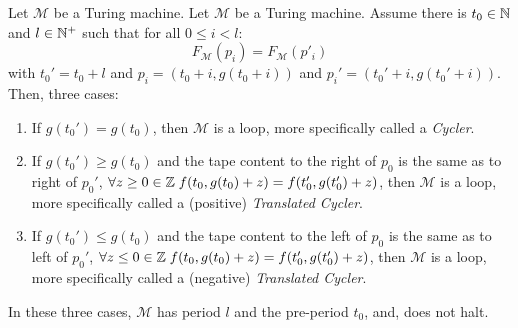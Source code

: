 \begin{theorem}[Loops] Let $\mathcal{M}$ be a Turing machine.
    Let $\mathcal{M}$ be a Turing machine.
    Assume there is $ t_0 \in \mathbb{N}$ and $l \in \mathbb{N}^+$ such that
    for all $0 \leq i < l$: $$F_\mathcal{M}(p_i)   = F_\mathcal{M}(p'_i)$$
    with $t_0' = t_0+l$ and $p_i = (t_0+i, g(t_0+i))$ and $p_i' = (t_0'+i, g(t_0'+i))$. Then, three cases:
    \begin{enumerate}
        \item If $g(t_0') = g(t_0)$, then $\mathcal{M}$ is a loop, more specifically called a \textit{Cycler}.\label{th:case1}
        \item If $g(t_0') \geq g(t_0)$ and the tape content to the right of $p_0$ is the same as to right of $p_0'$, \ie $\forall z \geq 0 \in  \mathbb{Z} \; f(t_0,g(t_0)+z) = f(t_0',g(t_0')+z)$, then $\mathcal{M}$ is a loop, more specifically called a (positive) \textit{Translated Cycler}.\label{th:case2}
        \item If $g(t_0') \leq g(t_0)$ and the tape content to the left of $p_0$ is the same as to left of $p_0'$, \ie $\forall z \leq 0 \in \mathbb{Z} \; f(t_0,g(t_0)+z) = f(t_0',g(t_0')+z)$, then $\mathcal{M}$ is a loop, more specifically called a (negative) \textit{Translated Cycler}.\label{th:case3}
    \end{enumerate}
    In these three cases, $\mathcal{M}$ has period $l$ and the pre-period $t_0$, and, does not halt.
\end{theorem}

